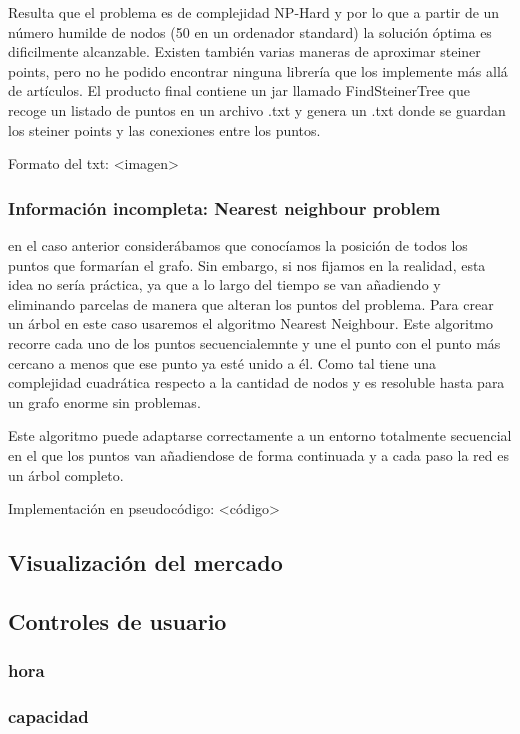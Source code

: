 \documentclass[12pt,a4paper,openright,oneside]{article}
\numberwithin{equation}{section}
\theoremstyle{definition}
\begin{document}
Resulta que el problema es de complejidad NP-Hard y por lo que a partir de un número humilde de nodos (50 en un ordenador standard) la solución óptima es dificilmente alcanzable. Existen también varias maneras de aproximar steiner points, pero no he podido encontrar ninguna librería que los implemente más allá de artículos. El producto final contiene un jar llamado FindSteinerTree que recoge un listado de puntos en un archivo .txt y genera un .txt donde se guardan los steiner points y las conexiones entre los puntos.

Formato del txt: <imagen>

\subsubsection{Información incompleta: Nearest neighbour problem}
en el caso anterior considerábamos que conocíamos la posición de todos los puntos que formarían el grafo. Sin embargo, si nos fijamos en la realidad, esta idea no sería práctica, ya que a lo largo del tiempo se van añadiendo y eliminando parcelas de manera que alteran los puntos del problema. Para crear un árbol en este caso usaremos el algoritmo Nearest Neighbour. Este algoritmo recorre cada uno de los puntos secuencialemnte y une el punto con el punto más cercano a menos que ese punto ya esté unido a él. Como tal tiene una complejidad cuadrática respecto a la cantidad de nodos y es resoluble hasta para un grafo enorme sin problemas.

Este algoritmo puede adaptarse correctamente a un entorno totalmente secuencial en el que los puntos van añadiendose de forma continuada y a cada paso la red es un árbol completo.

Implementación en pseudocódigo: <código>

\subsection{Visualización del mercado}

\subsection{Controles de usuario}
\subsubsection{hora}
\subsubsection{capacidad}
\end{document}
